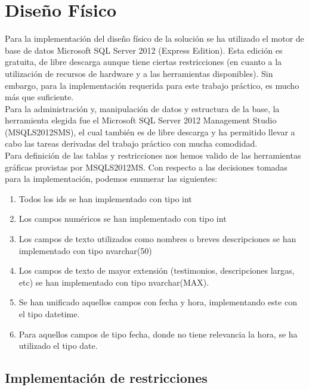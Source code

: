 \section{Diseño Físico}

\noindent Para la implementación del diseño físico de la solución se ha utilizado el motor de base de datos Microsoft SQL Server 2012 (Express Edition). Esta edición es gratuita, de libre descarga aunque tiene ciertas restricciones (en cuanto a la utilización de recursos de hardware y a las herramientas disponibles). Sin embargo, para la implementación requerida para este trabajo práctico, es mucho más que suficiente.\\
Para la administración y, manipulación de datos y estructura de la base, la herramienta elegida fue el Microsoft SQL Server 2012 Management Studio (MSQLS2012SMS), el cual también es de libre descarga y ha permitido llevar a cabo las tareas derivadas del trabajo práctico con mucha comodidad.\\
Para definición de las tablas y restricciones nos hemos valido de las herramientas gráficas provistas por MSQLS2012MS.
Con respecto a las decisiones tomadas para la implementación, podemos enumerar las siguientes:\\
\begin{enumerate}
\item Todos los ids se han implementado con tipo int\\
\item Los campos numéricos se han implementado con tipo int\\
\item Los campos de texto utilizados como nombres o breves descripciones se han implementado con tipo nvarchar(50)\\
\item Los campos de texto de mayor extensión (testimonios, descripciones largas, etc) se han implementado con tipo nvarchar(MAX).\\
\item Se han unificado aquellos campos con fecha y hora, implementando este con el tipo datetime.\\
\item Para aquellos campos de tipo fecha, donde no tiene relevancia la hora, se ha utilizado el tipo date.\\
\end{enumerate}

\subsection{Implementación de restricciones}

